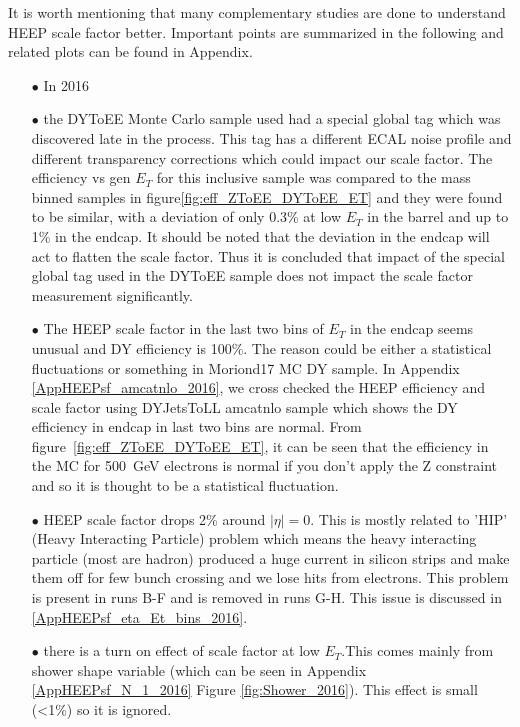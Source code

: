 It is worth mentioning that many complementary studies are done to understand HEEP scale factor better. Important points are summarized in the following and related plots can be found in Appendix.
\begin{itemize}
  \item[$\bullet$] In 2016
  \item[$\bullet$] the DYToEE Monte Carlo sample used had a special global tag which was discovered late in the process. This tag has a different ECAL noise profile and different transparency corrections which could impact our scale factor. The efficiency vs gen $E_T$ for this inclusive sample was compared to the mass binned samples in figure\ref{fig:eff_ZToEE_DYToEE_ET} and they were found to be similar, with a deviation of only 0.3\% at low $E_T$ in the barrel and up to 1\% in the endcap. It should be noted that the deviation in the endcap will act to flatten the scale factor. Thus it is concluded that impact of the special global tag used in the DYToEE sample does not impact the scale factor measurement significantly.
  \item[$\bullet$] The HEEP scale factor in the last two bins of $E_{T}$ in the endcap seems unusual and DY efficiency is 100\%. The reason could be either a statistical fluctuations or something in Moriond17 MC DY sample. In Appendix \ref{AppHEEPsf_amcatnlo_2016}, we cross checked the HEEP efficiency and scale factor using DYJetsToLL amcatnlo sample which shows the DY efficiency in endcap in last two bins are normal. From figure~\ref{fig:eff_ZToEE_DYToEE_ET}, it can be seen that the efficiency in the MC for 500~GeV electrons is normal if you don't apply the Z constraint and so it is thought to be a statistical fluctuation.
  \item[$\bullet$] HEEP scale factor drops 2\% around $|\eta|=0$. This is mostly related to 'HIP' (Heavy Interacting Particle) problem which means the heavy interacting particle (most are hadron) produced a huge current in silicon strips and make them off for few bunch crossing and we lose hits from electrons. This problem is present in runs B-F and is removed in runs G-H. This issue is discussed in \ref{AppHEEPsf_eta_Et_bins_2016}.
  \item[$\bullet$] there is a turn on effect of scale factor at low $E_{T}$.This comes mainly from shower shape variable (which can be seen in Appendix \ref{AppHEEPsf_N_1_2016} Figure \ref{fig:Shower_2016}). This effect is small (<1\%) so it is ignored.
\end{itemize}
\medskip

